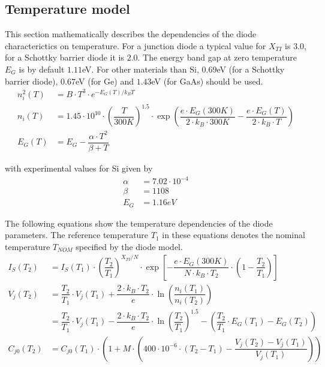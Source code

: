 \subsection{Temperature model}
\label{sec:DiodeTemp}

This section mathematically describes the dependencies of the diode
characterictics on temperature.  For a junction diode a typical value
for $X_{TI}$ is $3.0$, for a Schottky barrier diode it is $2.0$.  The
energy band gap at zero temperature $E_G$ is by default $1.11$eV.  For
other materials than Si, $0.69$eV (for a Schottky barrier diode),
$0.67$eV (for Ge) and $1.43$eV (for GaAs) should be used.
\begin{align}
n_i^2\left(T\right) &= B\cdot T^3 \cdot e^{-E_G\left(T\right)/k_B T}\\
n_i\left(T\right) &= 1.45\cdot 10^{10}\cdot \left(\dfrac{T}{300K}\right)^{1.5}\cdot\exp{\left(\dfrac{e\cdot E_G\left(300K\right)}{2\cdot k_B\cdot 300K} - \dfrac{e\cdot E_G\left(T\right)}{2\cdot k_B\cdot T}\right)}\\
E_G\left(T\right) &= E_G - \dfrac{\alpha\cdot T^2}{\beta + T}
\end{align}

with experimental values for Si given by
\begin{align*}
\alpha &= 7.02\cdot 10^{-4}\\
\beta &= 1108\\
E_G &= 1.16eV
\end{align*}

The following equations show the temperature dependencies of the diode
parameters.  The reference temperature $T_1$ in these equations
denotes the nominal temperature $T_{NOM}$ specified by the diode
model.
\begin{align}
I_S\left(T_2\right) &= I_S\left(T_1\right)\cdot \left(\dfrac{T_2}{T_1}\right)^{X_{TI} / N} \cdot \exp{\left[-\dfrac{e\cdot E_G\left(300K\right)}{N\cdot k_B\cdot T_2}\cdot \left(1 - \dfrac{T_2}{T_1}\right)\right]}\\
V_j\left(T_2\right) &= \dfrac{T_2}{T_1}\cdot V_j\left(T_1\right) + \dfrac{2\cdot k_B\cdot T_2}{e} \cdot \ln{\left(\dfrac{n_i\left(T_1\right)}{n_i\left(T_2\right)}\right)}\\
 &= \dfrac{T_2}{T_1}\cdot V_j\left(T_1\right) - \dfrac{2\cdot k_B\cdot T_2}{e} \cdot \ln{\left(\dfrac{T_2}{T_1}\right)^{1.5}} - \left(\dfrac{T_2}{T_1} \cdot E_G\left(T_1\right) - E_G\left(T_2\right)\right)\\
C_{j0}\left(T_2\right) &= C_{j0}\left(T_1\right)\cdot\left(1 + M\cdot\left(400\cdot 10^{-6} \cdot\left(T_2 - T_1\right) - \dfrac{V_j\left(T_2\right) - V_j\left(T_1\right)}{V_j\left(T_1\right)}\right)\right)
\end{align}

